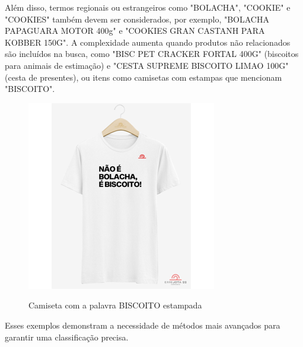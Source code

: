 Além disso, termos regionais ou estrangeiros como "BOLACHA", "COOKIE" e "COOKIES" também devem ser considerados, por exemplo, "BOLACHA PAPAGUARA MOTOR 400g" e "COOKIES GRAN CASTANH PARA KOBBER 150G". A complexidade aumenta quando produtos não relacionados são incluídos na busca, como "BISC PET CRACKER FORTAL 400G" (biscoitos para animais de estimação) e "CESTA SUPREME BISCOITO LIMAO 100G" (cesta de presentes), ou itens como camisetas com estampas que mencionam "BISCOITO".

\begin{figure}[h!]
    \begin{center}
    \caption{Camiseta com a palavra BISCOITO estampada}
    \includegraphics[scale=0.5]{images/camiseta.png}
    \label{fig:camiseta}
    \end{center}
\end{figure}

Esses exemplos demonstram a necessidade de métodos mais avançados para garantir uma classificação precisa.




